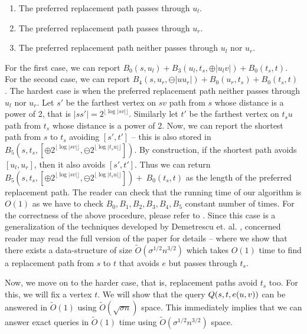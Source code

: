 \begin{enumerate}
\item  The  preferred replacement path passes through $u_l$.

\item  The preferred replacement path passes through $u_r$.

\item The preferred replacement path neither passes through $u_l$
nor $u_r$.

\end{enumerate}
\noindent For the first case, we  can report $B_0(s,u_l) + B_3(u_l, t_{s}, \oplus|u_lv|) + B_0(t_s,t) $. For the second case, we can report $B_4(s,u_r, \ominus  |uu_r|) + B_0(u_r,t_s) + B_0(t_s,t)$ . The hardest
case is when the preferred replacement path neither passes through
$u_l$ nor $u_r$. Let $s'$ be the farthest
vertex  on $sv$ path from $s$ whose distance is a power
of 2, that is $|ss'| = 2^{\lfloor \log |sv| \rfloor}$. Similarly let $t'$ be the farthest vertex on $t_{s}u$
path from $t_s$ whose distance is a power
of 2. Now,
we can  report the shortest path from $s$ to $t_{s}$ avoiding
$[s',t']$ -- this is also stored in $B_5(s,t_s,[\oplus 2^{\lfloor \log |sv| \rfloor}, \ominus 2^{\lfloor
\log |t_su| \rfloor}] )$. By construction, if the shortest path avoids $[u_l,u_r]$, then it also
avoids $[s',t']$. Thus we can return $B_5(s,t_s,[\oplus 2^{\lfloor \log |sv| \rfloor}, \ominus 2^{\lfloor
\log |t_su| \rfloor}] ) +\ B_0(t_s,t)$ as the length  of the preferred replacement path.
The reader can check that the running time of our algorithm
is $O(1)$ as we have to check $B_0,B_1,B_2,B_3,B_4,B_5$ constant number of times.
For the correctness of the above procedure, please refer to \cite{DemetrescuTCR08,DuanP09}.
\else
Since this case is a generalization of the techniques developed by
Demetrescu et. al. \cite{DemetrescuTCR08}, concerned reader may read
the full version of the paper for details -- where we show that there exists a data-structure
of size $\tilde O(\sigma^{1/2}n^{3/2})$ which takes $O(1)$ time to find a replacement
path from $s$ to $t$ that avoids $e$ but passes through $t_s$.
\fi

Now, we move on to the harder case, that is, replacement paths avoid $t_s$ too. For this, we will  fix a vertex $t$. We will show
that the query
${\sc Q}(s,t,e(u,v))$  can be answered
in $\tilde O(1)$ using $\tilde O(\sqrt{\sigma n})$ space.
This immediately implies that we can answer exact queries
in $\tilde O(1)$ time using $\tilde O(\sigma^{1/2} n^{3/2})$
space.

